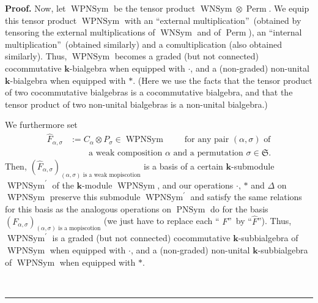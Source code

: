\documentclass[numbers=enddot,12pt,final,onecolumn,notitlepage]{scrartcl}%
\theoremstyle{definition}
\newenvironment{proof}[1][Proof]{\noindent\textbf{#1.} }{\ \rule{0.5em}{0.5em}}
\begin{document}
\begin{proof}
Now, let $\operatorname*{WPNSym}$ be the tensor product $\operatorname*{WNSym}%
\otimes\operatorname*{Perm}$. We equip this tensor product
$\operatorname*{WPNSym}$ with an \textquotedblleft external
multiplication\textquotedblright\ (obtained by tensoring the external
multiplications of $\operatorname*{WNSym}$ and of $\operatorname*{Perm}$), an
\textquotedblleft internal multiplication\textquotedblright\ (obtained
similarly) and a comultiplication (also obtained similarly). Thus,
$\operatorname*{WPNSym}$ becomes a graded (but not connected) cocommutative
$\mathbf{k}$-bialgebra when equipped with $\cdot$, and a (non-graded)
non-unital $\mathbf{k}$-bialgebra when equipped with $\ast$. (Here we use the
facts that the tensor product of two cocommutative bialgebras is a
cocommutative bialgebra, and that the tensor product of two non-unital
bialgebras is a non-unital bialgebra.)

We furthermore set%
\begin{align*}
\widehat{F}_{\alpha,\sigma}  &  :=C_{\alpha}\otimes P_{\sigma}\in
\operatorname*{WPNSym}\ \ \ \ \ \ \ \ \ \ \text{for any pair }\left(
\alpha,\sigma\right)  \text{ of}\\
&  \ \ \ \ \ \ \ \ \ \ \text{a weak composition }\alpha\text{ and a
permutation }\sigma\in\mathfrak{S}.
\end{align*}
Then, $\left(  \widehat{F}_{\alpha,\sigma}\right)  _{\left(  \alpha
,\sigma\right)  \text{ is a weak mopiscotion}}$ is a basis of a certain
$\mathbf{k}$-submodule $\operatorname*{WPNSym}\nolimits^{\prime}$ of the
$\mathbf{k}$-module $\operatorname*{WPNSym}$, and our operations $\cdot$,
$\ast$ and $\Delta$ on $\operatorname*{WPNSym}$ preserve this submodule
$\operatorname*{WPNSym}\nolimits^{\prime}$ and satisfy the same relations for
this basis as the analogous operations on $\operatorname*{PNSym}$ do for the
basis $\left(  F_{\alpha,\sigma}\right)  _{\left(  \alpha,\sigma\right)
\text{ is a mopiscotion}}$ (we just have to replace each \textquotedblleft%
$F$\textquotedblright\ by \textquotedblleft$\widehat{F}$\textquotedblright).
Thus, $\operatorname*{WPNSym}\nolimits^{\prime}$ is a graded (but not
connected) cocommutative $\mathbf{k}$-subbialgebra of $\operatorname*{WPNSym}$
when equipped with $\cdot$, and a (non-graded) non-unital $\mathbf{k}%
$-subbialgebra of $\operatorname*{WPNSym}$ when equipped with $\ast$.


\end{proof}
\end{document}
